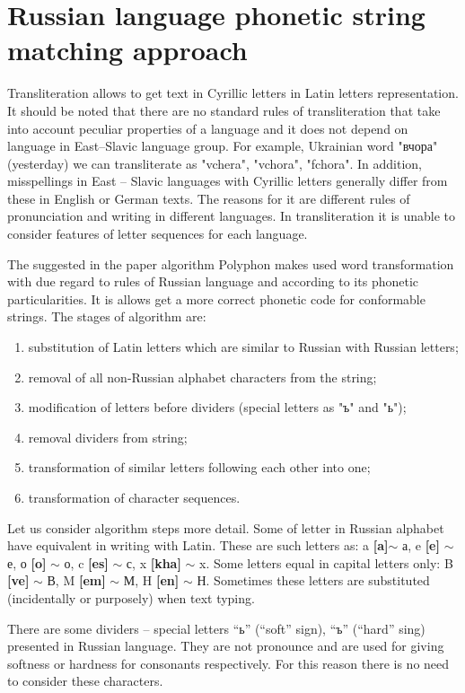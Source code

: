 \documentclass[conference,a4paper]{IEEEtran}
\begin{document}
\section{Russian language phonetic string matching approach}
Transliteration allows to get text in Cyrillic letters in Latin letters representation. It should be noted that there are no standard rules of transliteration that take into account peculiar properties of a language and it does not depend on language in East--Slavic language group. For example, Ukrainian word "вчора" (yesterday) we can transliterate as "vchera", "vchora", "fchora". In addition, misspellings in East – Slavic languages with Cyrillic letters generally differ from these in English or German texts. The reasons for it are different rules of pronunciation and writing in different languages. In transliteration it is unable to consider features of letter sequences for each language.

The suggested in the paper algorithm Polyphon makes used word transformation with due regard to rules of Russian language and according to its phonetic particularities. It is allows get a more correct phonetic code for conformable strings. The stages of algorithm are:

\begin{enumerate}
\item substitution of Latin letters which are similar to Russian with Russian letters;
\item removal of all non-Russian alphabet characters from the string;
\item modification of letters before dividers (special letters as "ъ" and "ь");
\item removal dividers from string;
\item transformation of similar letters following each other into one;
\item transformation of character sequences.
\end{enumerate}

Let us consider algorithm steps more detail. Some of letter in Russian alphabet have equivalent in writing with Latin. These are such letters as: a \textbf{[a]}$\sim$ а, e \textbf{[e]} $\sim$ е, о \textbf{[o]} $\sim$ о, c \textbf{[es]} $\sim$ с, x \textbf{[kha]} $\sim$ x. Some letters equal in capital letters only: B \textbf{[ve]} $\sim$ В, M \textbf{[em]} $\sim$ М, H \textbf{[en]} $\sim$ Н. Sometimes these letters are substituted (incidentally or purposely) when text typing. 

There are some dividers – special letters “ь” (“soft” sign), “ъ” (“hard” sing) presented in Russian language. They are not pronounce and are used for giving softness or hardness for consonants respectively. For this reason there is no need to consider these characters.
\end{document}

